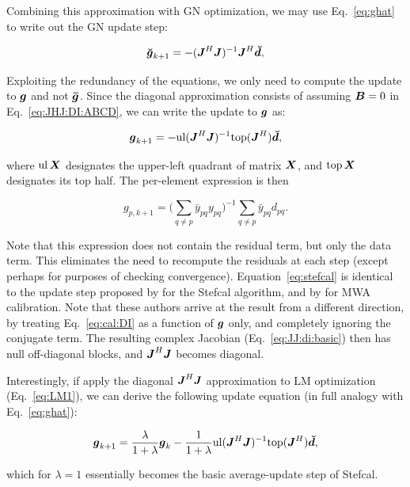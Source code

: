 \documentclass[useAMS,usenatbib]{mn2e}
\newcommand{\mat}[1]{{\bmath{#1}}}
\newcommand{\JJ}{\mat{J}} %
\newcommand{\JHJ}{\JJ^H\JJ} %
\begin{document}
Combining this approximation with GN optimization, we may use Eq.~\ref{eq:ghat} to write out the GN update step:

\[
\Gg_{k+1} = -(\JHJ)^{-1} \JJ^H \Dd,
\]

Exploiting the redundancy of the equations, we only need to compute the update to $\bmath{g}$ and not $\bmath{\bar g}$.
Since the diagonal approximation consists of assuming $\bmath{B}=0$ in Eq.~\ref{eq:JHJ:DI:ABCD}, we can write the 
update to $\bmath{g}$ as:

\newcommand{\TOP}{\mathrm{top}}
\newcommand{\UL}{\mathrm{ul}}

\[
\bmath{g}_{k+1} = -\UL(\JHJ)^{-1} \TOP(\JJ^H) \Dd,
\]

where $\UL\,\bmath{X}$ designates the upper-left quadrant of matrix $\bmath{X}$, and $\TOP\,\bmath{X}$ designates its top half. The per-element expression is then

\begin{equation}
\label{eq:stefcal}
g_{p,k+1} = \big( \sum\limits_{q\ne p} \bar{y}_{pq} y_{pq} \big)^{-1} \sum\limits_{q\ne p} \bar{y}_{pq} d_{pq}.
\end{equation}

Note that this expression does not contain the residual term, but only the data term. This eliminates the need to 
recompute the residuals at each step (except perhaps for purposes of checking convergence). Equation~\ref{eq:stefcal} 
is identical to the update step proposed by \citet{Stefcal} for the Stefcal algorithm, and by \citet{Mitchell-RTS} for MWA calibration. Note that these authors arrive at the result from a different 
direction, by treating Eq.~\ref{eq:cal:DI} as a function of $\bmath{g}$ only, and completely ignoring the conjugate term. 
The resulting complex Jacobian (Eq.~\ref{eq:JJ:di:basic}) then has null off-diagonal blocks, and $\JJ^H\JJ$ becomes 
diagonal.

Interestingly, if apply the diagonal $\JJ^H\JJ$ approximation to LM optimization (Eq.~\ref{eq:LM1}), we can derive the following
update equation (in full analogy with Eq.~\ref{eq:ghat}):

\begin{equation}
\bmath{g}_{k+1} = \frac{\lambda}{1+\lambda}\bmath{g}_k - \frac{1}{1+\lambda} \UL(\JHJ)^{-1} \TOP(\JJ^H) \Dd,
\label{eq:stefcal-lambda-average}
\end{equation}

which for $\lambda=1$ essentially becomes the basic average-update step of Stefcal.
\end{document}
